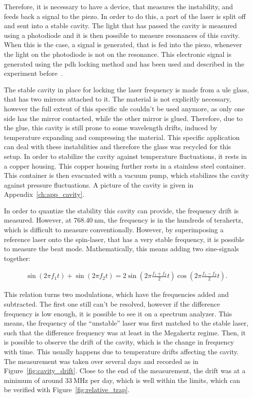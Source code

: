 Therefore, it is necessary to have a device, that measures the instability, and feeds back a signal to the piezo. In order to do this, a part of the laser is split off and sent into a stable cavity. The light that has passed the cavity is measured using a photodiode and it is then possible to measure resonances of this cavity. When this is the case, a signal is generated, that is fed into the piezo, whenever the light on the photodiode is not on the resonance. This electronic signal is generated using the \acl{pdh} locking method and has been used and described in the experiment before~\cite{Hirthe2018}.

The stable cavity in place for locking the laser frequency is made from a \ac{ule} glass, that has two mirrors attached to it. The material is not explicitly necessary, however the full extent of this specific \ac{ule} couldn't be used anymore, as only one side has the mirror contacted, while the other mirror is glued. Therefore, due to the glue, this cavity is still prone to some wavelength drifts, induced by temperature expanding and compressing the material. This specific application can deal with these instabilities and therefore the glass was recycled for this setup. In order to stabilize the cavity against temperature fluctuations, it rests in a copper housing. This copper housing further rests in a stainless steel container. This container is then evacuated with a vacuum pump, which stabilizes the cavity against pressure fluctuations. A picture of the cavity is given in Appendix~\ref{ch:app_cavity}.

In order to quantize the stability this cavity can provide, the frequency drift is measured. However, at $\SI{768.40}{\nano\meter}$, the frequency is in the hundreds of terahertz, which is difficult to measure conventionally. However, by superimposing a reference laser onto the spin-laser, that has a very stable frequency, it is possible to measure the beat mode. Mathematically, this means adding two sine-signals together:

\begin{align}
	\sin{\left(2\pi f_1 t\right)} + \sin{\left( 2 \pi f_2 t \right)}
	= 2 \sin{\left( 2\pi \frac{f_1+f_2}{2}t \right)} \cos{\left( 2\pi \frac{f_1-f_2}{2}t \right)}.
\end{align}

This relation turns two modulations, which have the frequencies added and subtracted. The first one still can't be resolved, however if the difference frequency is low enough, it is possible to see it on a spectrum analyzer. This means, the frequency of the ``unstable'' laser was first matched to the stable laser, such that the difference frequency was at least in the Megahertz regime. Then, it is possible to observe the drift of the cavity, which is the change in frequency with time. This usually happens due to temperature drifts affecting the cavity. The measurement was taken over several days and recorded as in Figure~\ref{fig:cavity_drift}. Close to the end of the measurement, the drift was at a minimum of around $\SI{33}{\mega\hertz}$ per day, which is well within the limits, which can be verified with Figure~\ref{fig:relative_trap}.

